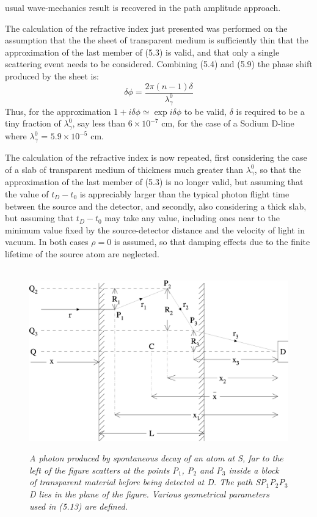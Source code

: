 \documentclass [12pt]{article}
\begin{document}
{  usual wave-mechanics result is recovered in the path amplitude approach.
  \par The calculation of the refractive index just presented was performed on the
  assumption that the the sheet of transparent medium is sufficiently thin that
  the approximation of the last member of (5.3) is valid, and that only a single 
   scattering event needs to be considered. Combining (5.4) and (5.9) the phase shift 
   produced by the sheet is:
    \begin{equation}
  \delta \phi = \frac{2 \pi (n-1) \delta}{\lambda_{\gamma}^0}
    \end{equation}
 Thus, for the approximation $1+i\delta \phi \simeq \exp i \delta \phi$ to be valid,
  $ \delta $ is required to be a tiny fraction of $\lambda_{\gamma}^0$, say less than $6 \times 10^{-7}$ cm,
  for the case of a Sodium D-line where $\lambda_{\gamma}^0$ =  $5.9 \times 10^{-5}$ cm. 
  \par The calculation of the refractive index is now repeated, first considering the case of a 
   slab of transparent medium of thickness much greater than  $\lambda_{\gamma}^0$, so that 
   the approximation of the last member of (5.3) is no longer valid, but assuming that
   the value of $t_D-t_0$ is appreciably larger than the typical photon flight time between the source
   and the detector, and secondly, also considering a thick slab, but assuming that $t_D-t_0$ may take
   any value, including ones near to the minimum value fixed by the source-detector
   distance and the velocity of light in vacuum. In both cases $\rho = 0$ is assumed, so that damping
   effects due to the finite lifetime of the source atom are neglected.

\begin{figure}[htbp]
\begin{center}
\hspace*{-0.5cm}\mbox{
\includegraphics[width=5in]{poptf3c.eps}}
\caption{{\sl A photon produced by spontaneous decay of an atom at S, far to the left
 of the figure scatters at the points P$_1$, P$_2$  and P$_3$  inside a block
 of transparent material before being detected at D. The path SP$_1$P$_2$P$_3$D
  lies in the plane of the figure. Various geometrical parameters used in (5.13)
 are defined.}} 
\label{fig-fig3}
\end{center}
\end{figure}


}
\end{document}
